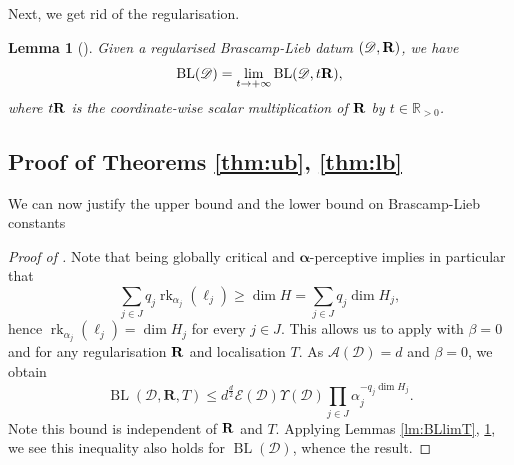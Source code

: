 \documentclass[a4paper,english]{amsart}
\newtheorem{lemma}[thm]{Lemma}
\theoremstyle{definition}
\newcommand{\comW}[1]{\marginpar{{\color{blue} #1}}}
\newcommand{\R}{\mathbb{R}}
\newcommand{\sN}{\mathscr{N}}
\newcommand{\bba}{\boldsymbol{\alpha}}
\newcommand{\1}{\mathbbm{1}}
\newcommand{\bbR}{{\bf{R}}}
\newcommand{\sD} {{\mathscr D}}
\newcommand{\sE}{\mathscr{E}}
\newcommand{\sA}{\mathscr{A}}
\newcommand{\bR}{\mathbf{R}}
\DeclareMathOperator{\End}{End}
\DeclareMathOperator{\Ell}{\mathscr{L}}
\DeclareMathOperator{\rk}{rk}
\DeclareMathOperator{\BL}{BL}
\begin{document}
Next, we get rid of the regularisation.
\begin{lemma}[{\cite[Eq. (44)]{BCCT08}}]
\label{lm:BLlimR}
Given a regularised Brascamp-Lieb datum $(\sD, \bbR)$, we have %
\[
\BL(\sD) = \lim_{t \to +\infty} \BL(\sD, t \bbR),
\]
where $t \bbR$ is the coordinate-wise scalar multiplication of $\bbR$ by $t \in \R_{>0}$.
\end{lemma}

\subsection{Proof of Theorems \ref{thm:ub}, \ref{thm:lb}}
We can now justify the upper bound   and the lower bound  on Brascamp-Lieb constants
\begin{proof}[Proof of  ]
Note that being globally critical and $\bba$-perceptive implies in particular that
\[
\sum_{j \in J} q_j \rk_{\alpha_j}(\ell_j) \geq \dim H = \sum_{j \in J} q_j \dim H_j,
\]
hence $\rk_{\alpha_j}(\ell_j) = \dim H_j$ for every $j \in J$.
This allows us to apply  with $\beta=0$ and for any regularisation $\bbR$ and localisation $T$.
As $\sA(\sD) = d$ and $\beta=0$, we obtain
\[
\BL(\sD, \bR, T) \leq d^{\frac{d}{2}} \sE(\sD) \Upsilon(\sD) \prod_{j \in J} \alpha_j^{- q_j \dim H_j}.
\]
Note this bound  is independent of $\bbR$ and $T$.
Applying Lemmas \ref{lm:BLlimT}, \ref{lm:BLlimR}, we see this inequality also holds for $\BL(\sD)$, whence the result.
\end{proof}
\end{document}
